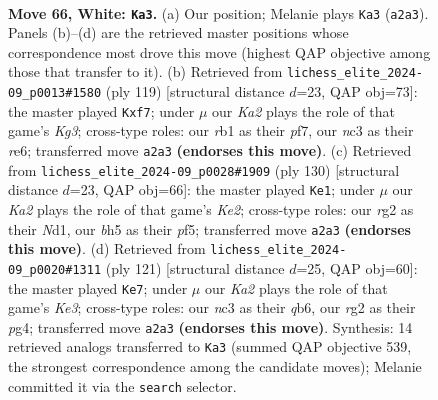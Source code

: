 \documentclass[11pt]{article}
\begin{document}
\clearpage

\begin{figure}[p]\centering
\begin{subfigure}{0.46\textwidth}\centering
\resizebox{\linewidth}{!}{%
\newchessgame
\chessboard[
  setfen={8/7p/5k2/4p2b/8/2n5/K5r1/1r6 w - - 5 66},
  showmover=false,
  pgfstyle=straightmove, color=movearrow, markmove={a2-a3}
]}
\caption{}
\end{subfigure}\hfill
\begin{subfigure}{0.46\textwidth}\centering
\resizebox{\linewidth}{!}{%
\newchessgame
\chessboard[
  setfen={8/5P2/4R1k1/8/4P3/7N/7K/8 b - - 0 60},
  showmover=false,
  pgfstyle=straightmove, color=movearrow, markmove={g6-f7}
]}
\caption{}
\end{subfigure}
\\[4pt]
\begin{subfigure}{0.46\textwidth}\centering
\resizebox{\linewidth}{!}{%
\newchessgame
\chessboard[
  setfen={8/5k1p/8/5p2/3n4/8/4K1NP/2rN4 w - - 10 66},
  showmover=false,
  pgfstyle=straightmove, color=movearrow, markmove={e2-e1}
]}
\caption{}
\end{subfigure}\hfill
\begin{subfigure}{0.46\textwidth}\centering
\resizebox{\linewidth}{!}{%
\newchessgame
\chessboard[
  setfen={2K5/2P5/1Q2k3/5R2/6P1/8/8/8 b - - 0 61},
  showmover=false,
  pgfstyle=straightmove, color=movearrow, markmove={e6-e7}
]}
\caption{}
\end{subfigure}
\caption{\textbf{Move 66, White: \texttt{Ka3}.} (a) Our position; Melanie plays \texttt{Ka3} (\texttt{a2a3}). Panels (b)--(d) are the retrieved master positions whose correspondence most drove this move (highest QAP objective among those that transfer to it). (b) Retrieved from \texttt{lichess\_elite\_2024-09\_p0013\#1580} (ply 119) [structural distance $d$=23, QAP obj=73]: the master played \texttt{Kxf7}; under $\mu$ our \emph{Ka2} plays the role of that game's \emph{Kg3}; cross-type roles: our \emph{r}b1 as their \emph{p}f7, our \emph{n}c3 as their \emph{r}e6; transferred move \texttt{a2a3} \textbf{(endorses this move)}. (c) Retrieved from \texttt{lichess\_elite\_2024-09\_p0028\#1909} (ply 130) [structural distance $d$=23, QAP obj=66]: the master played \texttt{Ke1}; under $\mu$ our \emph{Ka2} plays the role of that game's \emph{Ke2}; cross-type roles: our \emph{r}g2 as their \emph{N}d1, our \emph{b}h5 as their \emph{p}f5; transferred move \texttt{a2a3} \textbf{(endorses this move)}. (d) Retrieved from \texttt{lichess\_elite\_2024-09\_p0020\#1311} (ply 121) [structural distance $d$=25, QAP obj=60]: the master played \texttt{Ke7}; under $\mu$ our \emph{Ka2} plays the role of that game's \emph{Ke3}; cross-type roles: our \emph{n}c3 as their \emph{q}b6, our \emph{r}g2 as their \emph{p}g4; transferred move \texttt{a2a3} \textbf{(endorses this move)}. Synthesis: 14 retrieved analogs transferred to \texttt{Ka3} (summed QAP objective 539, the strongest correspondence among the candidate moves); Melanie committed it via the \texttt{search} selector.}
\label{fig:thought-m130}
\end{figure}
\end{document}
